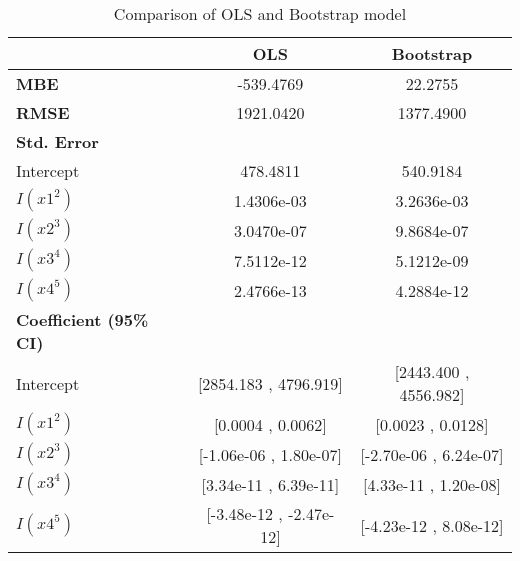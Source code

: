 \begin{table}
	\centering
	\caption{Comparison of OLS and Bootstrap model}
	\begin{tabular}{lcc}
		\hline
		& \textbf{OLS} & \textbf{Bootstrap} \\
		\hline
		\textbf{MBE} & -539.4769 & 22.2755 \\
		\textbf{RMSE} & 1921.0420 & 1377.4900 \\
		\hline
		\textbf{Std. Error} \\
		\hline
		Intercept & 478.4811 & 540.9184 \\
		$I(x1^2)$ & 1.4306e-03 & 3.2636e-03 \\
		$I(x2^3)$ & 3.0470e-07 & 9.8684e-07 \\
		$I(x3^4)$ & 7.5112e-12 & 5.1212e-09 \\
		$I(x4^5)$ & 2.4766e-13 & 4.2884e-12 \\
		\hline
		\textbf{Coefficient (95\% CI)} \\
		\hline
		Intercept & [2854.183 , 4796.919] & [2443.400 , 4556.982] \\
		$I(x1^2)$ & [0.0004 , 0.0062] & [0.0023 , 0.0128] \\
		$I(x2^3)$ & [-1.06e-06 , 1.80e-07] & [-2.70e-06 , 6.24e-07] \\
		$I(x3^4)$ & [3.34e-11 , 6.39e-11] & [4.33e-11 , 1.20e-08] \\
		$I(x4^5)$ & [-3.48e-12 , -2.47e-12] & [-4.23e-12 , 8.08e-12] \\
		\hline
	\end{tabular}
\end{table}


